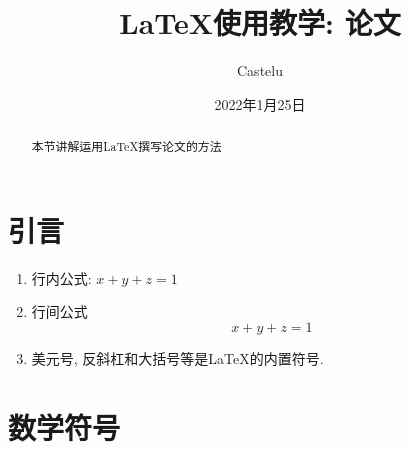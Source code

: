 \documentclass[a4paper, 11pt, UTF8]{article}
\title{\LaTeX 使用教学: 论文}
\author{Castelu}
\date{2022年1月25日}
\theoremstyle{plain}
\theoremstyle{definition}
\theoremstyle{remark}
\begin{document}
	\maketitle
	\begin{abstract}
		本节讲解运用\LaTeX 撰写论文的方法
	\end{abstract}

	\setcounter{section}{-1}
	
	
	\section{引言}
	
	\begin{enumerate}[1、]
		\item 行内公式: $x+y+z=1$
		
		\item 行间公式
		$$x+y+z=1$$
		
		\item 美元号, 反斜杠和大括号等是\LaTeX 的内置符号.		
	\end{enumerate}
	
	\section{数学符号}
	
\end{document}
